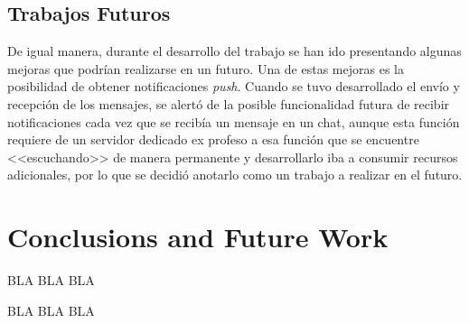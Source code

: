 \clearpage

\section{Trabajos Futuros}
De igual manera, durante el desarrollo del trabajo se han ido presentando algunas mejoras que podrían realizarse en un futuro. Una de estas mejoras es la posibilidad de obtener notificaciones \textit{push}. Cuando se tuvo desarrollado el envío y recepción de los mensajes, se alertó de la posible funcionalidad futura de recibir notificaciones cada vez que se recibía un mensaje en un chat, aunque esta función requiere de un servidor dedicado ex profeso a esa función que se encuentre <<escuchando>> de manera permanente y desarrollarlo iba a consumir recursos adicionales, por lo que se decidió anotarlo como un trabajo a realizar en el futuro.

\chapter{Conclusions and Future Work}
BLA BLA BLA

\clearpage

BLA BLA BLA